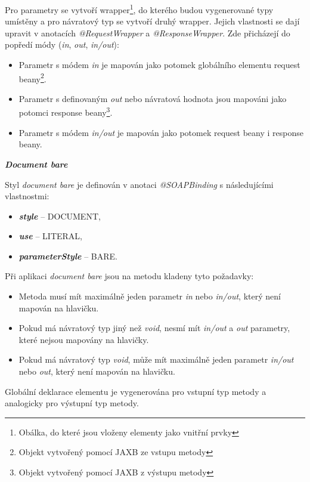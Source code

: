 \documentclass[11pt,twoside,a4paper]{book}
\begin{document}
Pro parametry se vytvoří wrapper\footnote{Obálka, do které jsou vloženy elementy
jako vnitřní prvky}, do kterého budou vygenerované typy umístěny a pro návratový
typ se vytvoří druhý wrapper. Jejich vlastnosti se dají upravit v anotacích
{\em @RequestWrapper} a {\em @ResponseWrapper}. Zde přicházejí do popředí módy
({\em in}, {\em out}, {\em in/out}):

\begin{itemize}
  \item Parametr s módem {\em in} je mapován jako potomek globálního elementu
  request beany\footnote{Objekt vytvořený pomocí JAXB ze vstupu metody}.
  \item Parametr s definovaným {\em out} nebo návratová hodnota jsou mapováni
  jako potomci response beany\footnote{Objekt vytvořený pomocí JAXB z výstupu metody}.
  \item Parametr s módem {\em in/out} je mapován jako potomek request beany i
  response beany.
\end{itemize}

\textbf{\textit{Document bare}}

Styl {\em document bare} je definován v anotaci {\em @SOAPBinding} s
následujícími vlastnostmi:

\begin{itemize}
  \item \textbf{\textit{style}} – DOCUMENT,
  \item \textbf{\textit{use}} – LITERAL,
  \item \textbf{\textit{parameterStyle}} – BARE.
\end{itemize}

Při aplikaci {\em document bare} jsou na metodu kladeny tyto požadavky:

\begin{itemize}
  \item Metoda musí mít maximálně jeden parametr {\em in} nebo {\em in/out},
  který není mapován na hlavičku.
  \item Pokud má návratový typ jiný než {\em void}, nesmí mít {\em in/out} a
  {\em out} parametry, které nejsou mapovány na hlavičky.
  \item Pokud má návratový typ {\em void}, může mít maximálně jeden parametr
  {\em in/out} nebo {\em out}, který není mapován na hlavičku.
\end{itemize}

Globální deklarace elementu je vygenerována pro vstupní typ metody a analogicky pro
výstupní typ metody.
\end{document}
